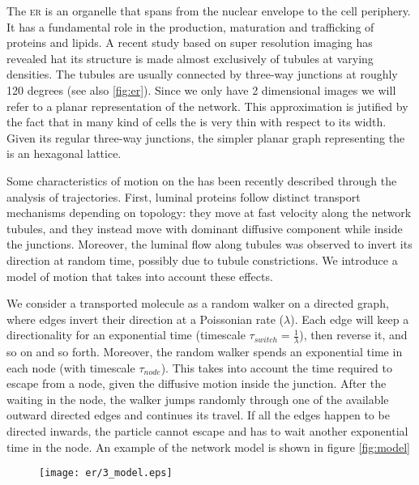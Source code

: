 The \textsc{er} is an organelle that spans from the nuclear envelope to the cell periphery. It has a fundamental role in the production, maturation and trafficking of proteins and lipids. A recent study based on super resolution imaging has revealed hat its structure is made almost exclusively of tubules at varying densities. The tubules are usually connected by three-way junctions at roughly 120 degrees (see also \cref{fig:er}). Since we only have 2 dimensional images we will refer to a planar representation of the  network. This approximation is jutified by the fact that in many kind of cells the  is very thin with respect to its width. Given its regular three-way junctions, the simpler planar graph representing the  is an hexagonal lattice.

Some characteristics of motion on the  has been recently described through the analysis of  trajectories. First, luminal proteins follow distinct transport mechanisms depending on topology: they move at fast velocity along the network tubules, and they instead move with dominant diffusive component while inside the junctions. Moreover, the luminal flow along tubules was observed to invert its direction at random time, possibly due to tubule constrictions. We introduce a model of motion that takes into account these effects.

We consider a transported molecule as a random walker on a directed graph, where edges invert their direction at a Poissonian rate ($\lambda$). Each edge will keep a directionality for an exponential time (timescale $\tau_{switch} = \frac{1}{\lambda}$), then reverse it, and so on and so forth. Moreover, the random walker spends an exponential time in each node (with timescale $\tau_{node}$). This takes into account the time required to escape from a node, given the diffusive motion inside the junction. After the waiting in the node, the walker jumps randomly through one of the available outward directed edges and continues its travel. If all the edges happen to be directed inwards, the particle cannot escape and has to wait another exponential time in the node. An example of the network model is shown in figure \ref{fig:model}

\begin{figure}
  \texttt{[image: er/3\_model.eps]}
\end{figure}

